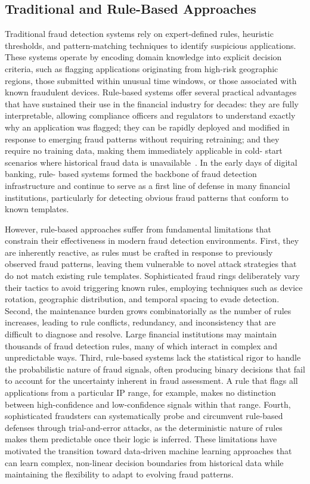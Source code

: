 \subsection{Traditional and Rule-Based Approaches}

Traditional fraud detection systems rely on expert-defined rules, heuristic
thresholds, and pattern-matching techniques to identify suspicious applications.
These systems operate by encoding domain knowledge into explicit decision
criteria, such as flagging applications originating from high-risk geographic
regions, those submitted within unusual time windows, or those associated with
known fraudulent devices. Rule-based systems offer several practical advantages
that have sustained their use in the financial industry for decades: they are
fully interpretable, allowing compliance officers and regulators to understand
exactly why an application was flagged; they can be rapidly deployed and
modified in response to emerging fraud patterns without requiring retraining;
and they require no training data, making them immediately applicable in cold-
start scenarios where historical fraud data is
unavailable~\cite{alenzi2020fraud}. In the early days of digital banking, rule-
based systems formed the backbone of fraud detection infrastructure and continue
to serve as a first line of defense in many financial institutions, particularly
for detecting obvious fraud patterns that conform to known templates.

However, rule-based approaches suffer from fundamental limitations that
constrain their effectiveness in modern fraud detection environments. First,
they are inherently reactive, as rules must be crafted in response to previously
observed fraud patterns, leaving them vulnerable to novel attack strategies that
do not match existing rule templates. Sophisticated fraud rings deliberately
vary their tactics to avoid triggering known rules, employing techniques such as
device rotation, geographic distribution, and temporal spacing to evade
detection. Second, the maintenance burden grows combinatorially as the number of
rules increases, leading to rule conflicts, redundancy, and inconsistency that
are difficult to diagnose and resolve. Large financial institutions may maintain
thousands of fraud detection rules, many of which interact in complex and
unpredictable ways. Third, rule-based systems lack the statistical rigor to
handle the probabilistic nature of fraud signals, often producing binary
decisions that fail to account for the uncertainty inherent in fraud assessment.
A rule that flags all applications from a particular IP range, for example,
makes no distinction between high-confidence and low-confidence signals within
that range. Fourth, sophisticated fraudsters can systematically probe and
circumvent rule-based defenses through trial-and-error attacks, as the
deterministic nature of rules makes them predictable once their logic is
inferred. These limitations have motivated the transition toward data-driven
machine learning approaches that can learn complex, non-linear decision
boundaries from historical data while maintaining the flexibility to adapt to
evolving fraud patterns.

